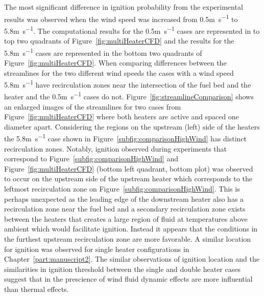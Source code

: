     The most significant difference in ignition probability from the experimental results was observed when the wind speed was increased from 0.5\si{\meter\per\second} to 5.8\si{\meter\per\second}. The computational results for the 0.5\si{\meter\per\second} cases are represented in to top two quadrants of Figure~\ref{fig:multiHeaterCFD} and the results for the 5.8\si{\meter\per\second} cases are represented in the bottom two quadrants of Figure~\ref{fig:multiHeaterCFD}. When comparing differences between the streamlines for the two different wind speeds the cases with a wind speed 5.8\si{\meter\per\second} have recirculation zones near the intersection of the fuel bed and the heater and the 0.5\si{\meter\per\second} cases do not. Figure~\ref{fig:streamlineComparison} shows an enlarged images of the streamlines for two cases from Figure~\ref{fig:multiHeaterCFD} where both heaters are active and spaced one diameter apart. Considering the regions on the upstream (left) side of the heaters the 5.8\si{\meter\per\second} case shown in Figure~\ref{subfig:comparisonHighWind} has distinct recirculation zones. Notably, ignition observed during experiments that correspond to Figure~\ref{subfig:comparisonHighWind} and Figure~\ref{fig:multiHeaterCFD} (bottom left quadrant, bottom plot) was observed to occur on the upstream side of the upstream heater which corresponds to the leftmost recirculation zone on Figure~\ref{subfig:comparisonHighWind}. This is perhaps unexpected as the leading edge of the downstream heater also has a recirculation zone near the fuel bed and a secondary recirculation zone exists between the heaters that creates a large region of fluid at temperatures above ambient which would facilitate ignition. Instead it appears that the conditions in the furthest upstream recirculation zone are more favorable. A similar location for ignition was observed for single heater configurations in Chapter~\ref{part:manuscript2}. The similar observations of ignition location and the similarities in ignition threshold between the single and double heater cases suggest that in the prescience of wind fluid dynamic effects are more influential than thermal effects.
